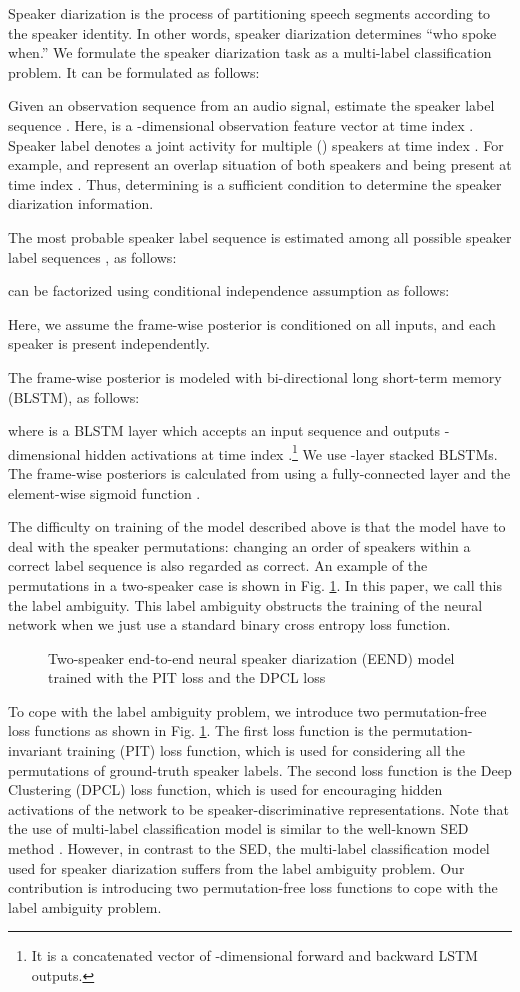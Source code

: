 \documentclass[a4paper]{article}
\newcommand{\pdffigure}[3][width=0.7\linewidth]{
	\begin{figure}[tb]
	\begin{center}
    \IfFileExists{./#2.pdf}{
	    \texttt{[image: \#2.pdf]}
	}{
	    \texttt{[image: \#2.pdf]}
    }
    \end{center}
    \caption{#3}
	\label{fig:#2}
	\end{figure}
}
\begin{document}
Speaker diarization is the process of partitioning speech segments
according to the speaker identity.
In other words, speaker diarization determines ``who spoke when.''
We formulate the speaker diarization task as a multi-label classification problem.
It can be formulated as follows:

Given an observation sequence  from an audio signal, estimate the speaker label sequence .
Here,  is a -dimensional observation feature vector at time index .
Speaker label  denotes a joint activity for multiple () speakers at time index .
For example,  and  represent an overlap situation of both speakers  and  being present at time index .
Thus, determining  is a sufficient condition to determine the speaker diarization information.

The most probable speaker label sequence  is estimated
among all possible speaker label sequences , as follows:

 can be factorized using conditional independence assumption as follows:

Here, we assume the frame-wise posterior is conditioned
on all inputs, and each speaker is present independently.

The frame-wise posterior  is modeled with bi-directional long short-term memory (BLSTM), as follows:

where  is a BLSTM layer which accepts an input sequence and outputs -dimensional hidden activations  at time index .\footnote{It is a concatenated vector of -dimensional forward and backward LSTM outputs.}
We use -layer stacked BLSTMs.
The frame-wise posteriors  is calculated from  using a fully-connected layer  and the element-wise sigmoid function .


The difficulty on training of the model described above is that the model have to deal with the speaker permutations: changing an order of speakers within a correct label sequence is also regarded as correct. An example of the permutations in a two-speaker case is shown in Fig. \ref{fig:trainingflow}.
In this paper, we call this the label ambiguity. This label ambiguity obstructs the training of the neural network when we just use a standard binary cross entropy loss function.

\pdffigure[width=0.92\linewidth]{trainingflow}{Two-speaker end-to-end neural speaker diarization (EEND) model trained with the PIT loss and the DPCL loss}

To cope with the label ambiguity problem, we introduce two permutation-free loss functions as shown in Fig. \ref{fig:trainingflow}.
The first loss function is the permutation-invariant training (PIT) loss function, which is used for considering all the permutations of ground-truth speaker labels. The second loss function is the Deep Clustering (DPCL) loss function, which is used for encouraging hidden activations of the network to be speaker-discriminative representations.
Note that the use of multi-label classification model is similar to the well-known SED method \cite{Adavanne2017}.
However, in contrast to the SED, the multi-label classification model used for speaker diarization suffers from the label ambiguity problem.
Our contribution is introducing two permutation-free loss functions to cope with the label ambiguity problem.
\end{document}
